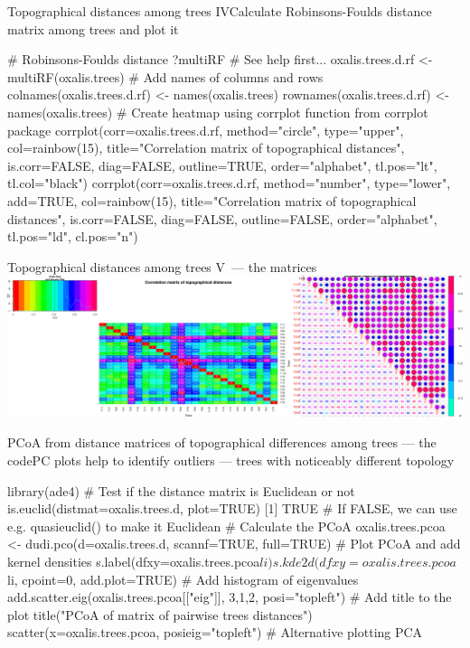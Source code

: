 \documentclass[compress, xelatex, 11pt, xcolor=svgnames, aspectratio=169,
	hyperref={
		bookmarks=true,
		unicode=true,
		colorlinks=true,
		pdftitle={Molecular data in R},
		plainpages=false,
		pdfauthor={Vojtech Zeisek},
		pdfsubject={Course about phylogeny and evolution in R},
		pdfcreator={XeLaTeX},
		pdfkeywords={R, evolution, phylogeny, molecular data},
		linkcolor=Crimson, %
		anchorcolor=Magenta, %
		citecolor=Magenta, %
		filecolor=Magenta, %
		menucolor=Magenta, %
		urlcolor=DodgerBlue, %
		},
	url={hyphens, lowtilde} %
	]{beamer}
\begin{document}
\begin{frame}[fragile]{Topographical distances among trees IV}{Calculate Robinsons-Foulds distance matrix among trees and plot it}
	\begin{spluscode}
    # Robinsons-Foulds distance
    ?multiRF # See help first...
    oxalis.trees.d.rf <- multiRF(oxalis.trees)
    # Add names of columns and rows
    colnames(oxalis.trees.d.rf) <- names(oxalis.trees)
    rownames(oxalis.trees.d.rf) <- names(oxalis.trees)
    # Create heatmap using corrplot function from corrplot package
    corrplot(corr=oxalis.trees.d.rf, method="circle", type="upper",
      col=rainbow(15), title="Correlation matrix of topographical
      distances", is.corr=FALSE, diag=FALSE, outline=TRUE,
      order="alphabet", tl.pos="lt", tl.col="black")
    corrplot(corr=oxalis.trees.d.rf, method="number", type="lower",
      add=TRUE, col=rainbow(15), title="Correlation matrix of
      topographical distances", is.corr=FALSE, diag=FALSE,
      outline=FALSE, order="alphabet", tl.pos="ld", cl.pos="n")
	\end{spluscode}
\end{frame}

\begin{frame}{Topographical distances among trees V~--- the matrices}
	\includegraphics[width=\textwidth]{oxalis-dist.png}
\end{frame}

\begin{frame}[fragile]{PCoA from distance matrices of topographical differences among trees --- the code}{PC plots help to identify outliers --- trees with noticeably different topology}
	\begin{spluscode}
    library(ade4) # Test if the distance matrix is Euclidean or not
    is.euclid(distmat=oxalis.trees.d, plot=TRUE)
    [1] TRUE # If FALSE, we can use e.g. quasieuclid() to make it Euclidean
    # Calculate the PCoA
    oxalis.trees.pcoa <- dudi.pco(d=oxalis.trees.d, scannf=TRUE, full=TRUE)
    # Plot PCoA and add kernel densities
    s.label(dfxy=oxalis.trees.pcoa$li)
    s.kde2d(dfxy=oxalis.trees.pcoa$li, cpoint=0, add.plot=TRUE)
    # Add histogram of eigenvalues
    add.scatter.eig(oxalis.trees.pcoa[["eig"]], 3,1,2, posi="topleft")
    # Add title to the plot
    title("PCoA of matrix of pairwise trees distances")
    scatter(x=oxalis.trees.pcoa, posieig="topleft") # Alternative plotting PCA
	\end{spluscode}
\end{frame}
\end{document}
